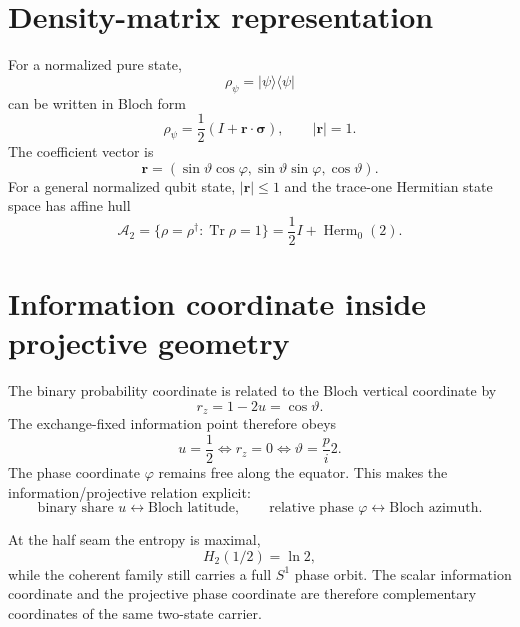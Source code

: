\documentclass[11pt,a4paper,twoside]{book}
\def\pi{pi}%
\theoremstyle{definition}
\begin{document}
\section{Density-matrix representation}

For a normalized pure state,
\begin{equation}
\rho_\psi=|\psi\rangle\langle\psi|
\end{equation}
can be written in Bloch form
\begin{equation}
\boxed{
\rho_\psi
=\frac12\left(I+\mathbf r\cdot\boldsymbol\sigma\right),
\qquad
|\mathbf r|=1.
}
\label{eq:v12_bloch_density}
\end{equation}
The coefficient vector is
\begin{equation}
\mathbf r
=(\sin\vartheta\cos\varphi,
\sin\vartheta\sin\varphi,
\cos\vartheta).
\end{equation}
For a general normalized qubit state, $|\mathbf r|\le1$ and the trace-one Hermitian state space has affine hull
\begin{equation}
\boxed{
\mathcal A_2
=\{\rho=\rho^\dagger:\operatorname{Tr}\rho=1\}
=\frac12I+\operatorname{Herm}_0(2).
}
\label{eq:v12_affine_qubit_hull}
\end{equation}

\section{Information coordinate inside projective geometry}

The binary probability coordinate is related to the Bloch vertical coordinate by
\begin{equation}
r_z=1-2u=\cos\vartheta.
\end{equation}
The exchange-fixed information point therefore obeys
\begin{equation}
u=\frac12
\iff
r_z=0
\iff
\vartheta=\frac\pi2.
\end{equation}
The phase coordinate $\varphi$ remains free along the equator. This makes the information/projective relation explicit:
\begin{equation}
\boxed{
\text{binary share }u
\longleftrightarrow
\text{Bloch latitude},
\qquad
\text{relative phase }\varphi
\longleftrightarrow
\text{Bloch azimuth}.
}
\end{equation}

At the half seam the entropy is maximal,
\begin{equation}
H_2(1/2)=\ln2,
\end{equation}
while the coherent family still carries a full $S^1$ phase orbit. The scalar information coordinate and the projective phase coordinate are therefore complementary coordinates of the same two-state carrier.
\end{document}
